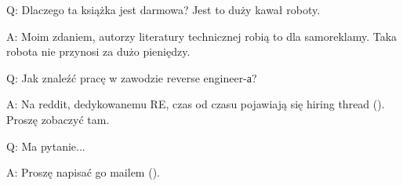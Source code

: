 \par Q: Dlaczego ta książka jest darmowa? Jest to duży kawał roboty.
\par A: Moim zdaniem, autorzy literatury technicznej robią to dla samoreklamy. Taka robota nie przynosi za dużo pieniędzy.

\par Q: Jak znaleźć pracę w zawodzie reverse engineer-а?
\par A: Na reddit, dedykowanemu RE\FNURLREDDIT, czas od czasu pojawiają się hiring thread (\RedditHiringThread{}).
Proszę zobaczyć tam.

\par Q: Ma pytanie...
\par A: Proszę napisać go mailem (\EMAIL).

